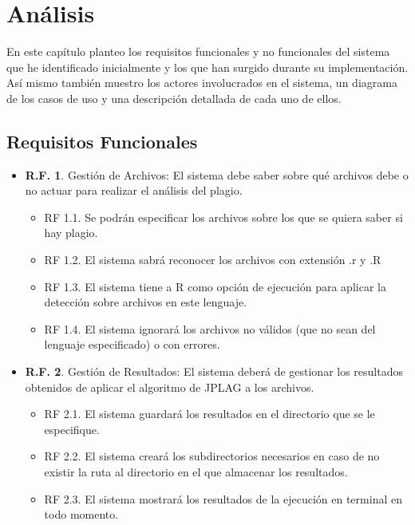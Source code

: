 \chapter{Análisis}

En este capítulo planteo los requisitos funcionales y no funcionales del sistema que he identificado inicialmente y los que han surgido durante su implementación. 
\newline
Así mismo también muestro los actores involucrados en el sistema, un diagrama de los casos de uso y una descripción detallada de cada uno de ellos.



\section{Requisitos Funcionales}
\begin{itemize}
\item \textbf{R.F. 1}. Gestión de Archivos: El sistema debe saber sobre qué archivos debe o no actuar para realizar el análisis del plagio.
	\begin{itemize}
	\item RF 1.1. Se podrán especificar los archivos sobre los que se quiera saber si hay plagio.
	\item RF 1.2. El sistema sabrá reconocer los archivos con extensión .r y .R
	\item RF 1.3. El sistema tiene a R como opción de ejecución para aplicar la detección sobre archivos en este lenguaje. 
	\item RF 1.4. El sistema ignorará los archivos no válidos (que no sean del lenguaje especificado) o con errores.
	\end{itemize}
\item \textbf{R.F. 2}. Gestión de Resultados: El sistema deberá de gestionar los resultados obtenidos de aplicar el algoritmo de JPLAG a los archivos.
	\begin{itemize}
	\item RF 2.1. El sistema guardará los resultados en el directorio que se le especifique.
	\item RF 2.2. El sistema creará los subdirectorios necesarios en caso de no existir la ruta al directorio en el que almacenar los resultados.
	\item RF 2.3. El sistema mostrará los resultados de la ejecución en terminal en todo momento.
	\end{itemize}
\end{itemize}


